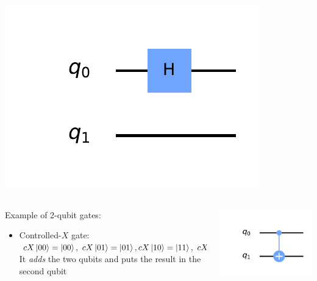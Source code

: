 \documentclass{beamer}
\renewcommand{\(}{\left(}
\renewcommand{\)}{\right)}
\renewcommand{\[}{\left[}
\renewcommand{\]}{\right]}
\begin{document}
\begin{frame}
\begin{columns}
\begin{column}[]{0.2\textwidth}
            \includegraphics[scale=0.5, trim = 100 65 40 35, clip]{h_qubit_1.pdf} 
        \end{column}
    \end{columns}
    \pause
    \begin{columns}
        \begin{column}[]{0.8\textwidth}
            Example of 2-qubit gates: 
            \begin{itemize}
                \item Controlled-$X$ gate: $cX \ket{00} = \ket{00}, \ cX \ket{01} = \ket{01},
                cX \ket{10} = \ket{11}, \ cX \ket{11} = \ket{10}.$ It \emph{adds} the two qubits and puts the result in the second qubit
            \end{itemize}
        \end{column}
        \begin{column}[]{0.2\textwidth}
            \centering
            \includegraphics[scale=0.5, trim = 100 25 40 35, clip]{cx_qubit_2.pdf} 
        \end{column}
    \end{columns}
\end{frame}
\end{document}
